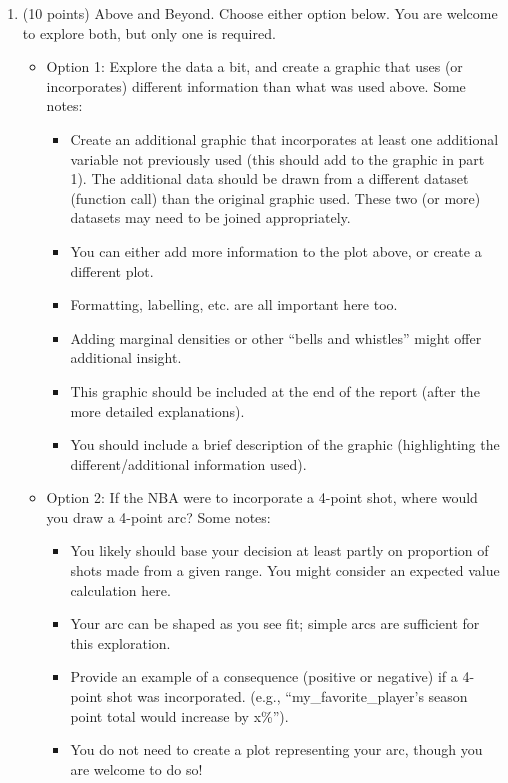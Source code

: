 \documentclass[
]{article}
\providecommand{\tightlist}{%
  \setlength{\itemsep}{0pt}\setlength{\parskip}{0pt}}
\begin{document}
\begin{enumerate}
\def\labelenumi{\arabic{enumi}.}
\setcounter{enumi}{3}
\item
  (10 points) Above and Beyond. Choose either option below. You are
  welcome to explore both, but only one is required.

  \begin{itemize}
  \item
    Option 1: Explore the data a bit, and create a graphic that uses (or
    incorporates) different information than what was used above. Some
    notes:

    \begin{itemize}
    \tightlist
    \item
      Create an additional graphic that incorporates at least one
      additional variable not previously used (this should add to the
      graphic in part 1). The additional data should be drawn from a
      different dataset (function call) than the original graphic used.
      These two (or more) datasets may need to be joined appropriately.
    \item
      You can either add more information to the plot above, or create a
      different plot.
    \item
      Formatting, labelling, etc. are all important here too.
    \item
      Adding marginal densities or other ``bells and whistles'' might
      offer additional insight.
    \item
      This graphic should be included at the end of the report (after
      the more detailed explanations).
    \item
      You should include a brief description of the graphic
      (highlighting the different/additional information used).
    \end{itemize}
  \item
    Option 2: If the NBA were to incorporate a 4-point shot, where would
    you draw a 4-point arc? Some notes:

    \begin{itemize}
    \tightlist
    \item
      You likely should base your decision at least partly on proportion
      of shots made from a given range. You might consider an expected
      value calculation here.
    \item
      Your arc can be shaped as you see fit; simple arcs are sufficient
      for this exploration.
    \item
      Provide an example of a consequence (positive or negative) if a
      4-point shot was incorporated. (e.g., ``my\_favorite\_player's
      season point total would increase by x\%'').
    \item
      You do not need to create a plot representing your arc, though you
      are welcome to do so!
    \end{itemize}
  \end{itemize}
\end{enumerate}
\end{document}
